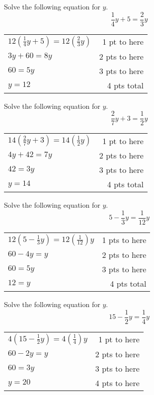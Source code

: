 {
	Solve the following equation for $y$. $$\frac{1}{4} y+5=  \frac{2}{3} y$$
}
{
	\begin{tabular}{l r}
	$12(\frac{1}{4}y+5)=  12(\frac{2}{3} y)$  & 1 pt to here\\
	$3y+60=8y$ & 2 pts to here\\
	$60=5y$ & 3 pts to here\\
	$y=12$  & 4 pts total
	\end{tabular}
}

{
	Solve the following equation for $y$. $$\frac{2}{7}y+3=  \frac{1}{2} y$$
}
{
	\begin{tabular}{l r}
	$14(\frac 27 y+3)= 14( \frac{1}{2} y)$    & 1 pt to here\\
	$4y+42=7y$ & 2 pts to here\\
	$42=3y$ & 3 pts to here\\
	$y=14$ & 4 pts total\\
	\end{tabular}
}

{
	Solve the following equation for $y$. $$5-\frac{1}{3}y=\frac{1}{12}y$$
}
{
	\begin{tabular}{l r}
	$12(5-\frac{1}{3}y)=12(\frac{1}{12})y$ & 1 pts to here\\
	$60-4y=y$ & 2 pts to here\\
	$60=5y$ & 3 pts to here\\
	$12=y$ & 4 pts total
	\end{tabular}
}

{
	Solve the following equation for $y$. $$15-\frac{1}{2}y=\frac{1}{4}y$$
}
{
	\begin{tabular}{l r}
	$4(15-\frac{1}{2}y)=4(\frac{1}{4})y$ &1 pt to here\\
	$60-2y=y$ & 2 pts to here\\
	$60=3y$ & 3 pts to here\\
	$y=20$ & 4 pts to here
	\end{tabular}
}
